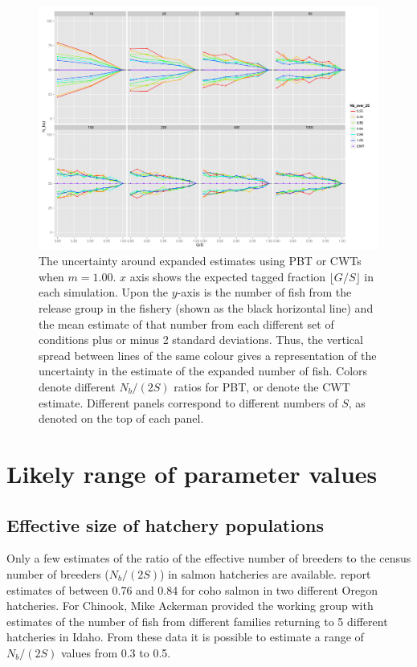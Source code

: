 \documentclass[11pt]{article}
\begin{document}
\begin{figure}
\includegraphics[width = .93\textwidth]{./images/sd_line_horns_m_1.pdf}
\caption{The uncertainty around expanded estimates using PBT or CWTs when $m = 1.00$.  $x$ axis shows the
expected tagged fraction $\lfloor G/S \rfloor$ in each simulation. Upon the $y$-axis is the number of fish from the
release group in the fishery (shown as the black horizontal line) and the mean estimate of that number from each different set of 
conditions plus or minus 2 standard deviations.  Thus, the vertical spread between lines of the same colour gives a representation
of the uncertainty in the estimate of the expanded number of fish. Colors denote different $N_b/(2S)$ ratios for PBT, or denote
the CWT estimate.  Different
panels correspond to different numbers of $S$, as denoted on the top of each panel.
\label{fig:horn1.0}}
\end{figure}



\section{Likely range of parameter values}

\subsection{Effective size of hatchery populations}

Only a few estimates of the ratio of the effective number of breeders to the census number of breeders ($N_b/(2S)$) in salmon
hatcheries are available.  \citet{Moyeretal2007} report estimates of between 0.76 and 0.84 for coho salmon in two different 
Oregon hatcheries.  For Chinook, Mike Ackerman provided the working group with estimates of the number of fish from different
families returning to 5 different
hatcheries in Idaho.  From these data it is possible to estimate a range of $N_b/(2S)$ values from 0.3 to 0.5.
\end{document}
